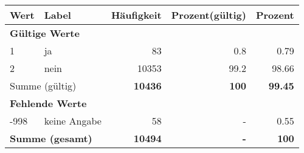      \begin{longtable}{lXrrr}
     \toprule
     \textbf{Wert} & \textbf{Label} & \textbf{Häufigkeit} & \textbf{Prozent(gültig)} & \textbf{Prozent} \\
     \endhead
     \midrule
     \multicolumn{5}{l}{\textbf{Gültige Werte}}\\

     1 &
     \multicolumn{1}{X}{ ja   } &


       \num{83} &
       \num[round-mode=places,round-precision=2]{0.8} &
         \num[round-mode=places,round-precision=2]{0.79} \\

     2 &
     \multicolumn{1}{X}{ nein   } &


       \num{10353} &
       \num[round-mode=places,round-precision=2]{99.2} &
         \num[round-mode=places,round-precision=2]{98.66} \\
     \midrule
     \multicolumn{2}{l}{Summe (gültig)} &
       \textbf{\num{10436}} &
     \textbf{\num{100}} &
       \textbf{\num[round-mode=places,round-precision=2]{99.45}} \\
     \multicolumn{5}{l}{\textbf{Fehlende Werte}}\\
       -998 &
       keine Angabe &
         \num{58} &
        - &
         \num[round-mode=places,round-precision=2]{0.55} \\
     \midrule
     \multicolumn{2}{l}{\textbf{Summe (gesamt)}} &
          \textbf{\num{10494}} &
        \textbf{-} &
        \textbf{\num{100}} \\
     \bottomrule
     \end{longtable}
     
